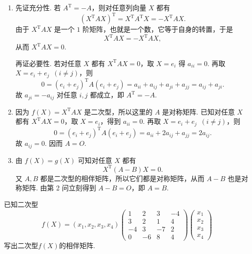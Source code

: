 \begin{solution}
    \begin{enumerate}
        \item 先证充分性. 若 $A^\mathrm{T}=-A$，则对任意列向量 $X$ 都有
              \[
                  (X^\mathrm{T}AX)^\mathrm{T}=X^\mathrm{T}A^\mathrm{T}X=-X^\mathrm{T}AX.
              \]
              由于 $X^\mathrm{T}AX$ 是一个 $1$ 阶矩阵，也就是一个数，它等于自身的转置，于是
              \[
                  X^\mathrm{T}AX=-X^\mathrm{T}AX,
              \]
              从而 $X^\mathrm{T}AX=0$.

              再证必要性. 若对任意 $X$ 都有 $X^\mathrm{T}AX=0$，取 $X=e_i$ 得 $a_{ii}=0$. 再取 $X=e_i+e_j\enspace(i\neq j)$，则
              \[
                  0=(e_i+e_j)^\mathrm{T}A(e_i+e_j)=a_{ii}+a_{ij}+a_{ji}+a_{jj}=a_{ij}+a_{ji}.
              \]
              故 $a_{ji}=-a_{ij}$ 对任意 $i,j$ 都成立，即 $A^\mathrm{T}=-A$.

        \item 因为 $f(X)=X^\mathrm{T}AX$ 是二次型，所以这里的 $A$ 是对称矩阵. 已知对任意 $X$ 都有 $X^\mathrm{T}AX=0$，取 $X=e_i$，得到 $a_{ii}=0$. 再取 $X=e_i+e_j\enspace(i\neq j)$，则
              \[
                  0=(e_i+e_j)^\mathrm{T}A(e_i+e_j)=a_{ii}+2a_{ij}+a_{jj}=2a_{ij}.
              \]
              故 $a_{ij}=0$. 因而 $A=O$.

        \item 由 $f(X)=g(X)$ 可知对任意 $X$ 都有
              \[
                  X^\mathrm{T}(A-B)X=0.
              \]
              又 $A,B$ 都是二次型的相伴矩阵，所以它们都是对称矩阵，从而 $A-B$ 也是对称矩阵. 由第 2 问立刻得到 $A-B=O$，即 $A=B$.
    \end{enumerate}
\end{solution}

\begin{example}{}{}
    已知二次型
    \[f(X)=(x_1,x_2,x_3,x_4)\begin{pmatrix}
            1 & 2 & 3 & -4 \\ 3 & 2 & 1 & 4 \\ -4 & 3 & -7 & 2 \\ 0 & -6 & 8 & 4
        \end{pmatrix}\begin{pmatrix}
            x_1 \\ x_2 \\ x_3 \\ x_4
        \end{pmatrix}\]
    写出二次型$f(X)$的相伴矩阵.
\end{example}

